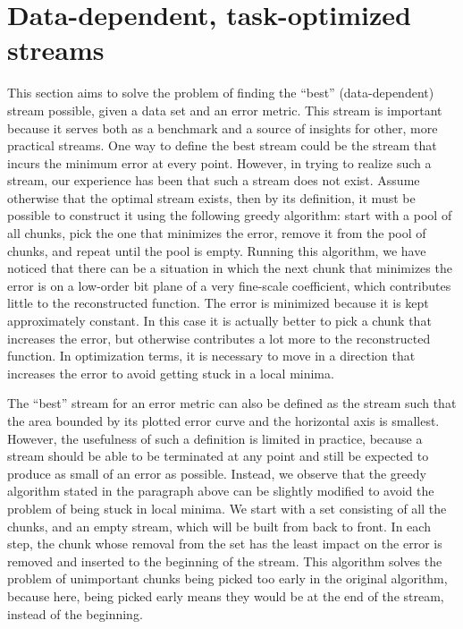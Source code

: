 \section{Data-dependent, task-optimized streams}
\label{sec:data_dep_streams}

This section aims to solve the problem of finding the ``best'' (data-dependent) stream possible,
given a data set and an error metric. This stream is important because it serves both as a benchmark
and a source of insights for other, more practical streams. One way to define the best stream could
be the stream that incurs the minimum error at every point. However, in trying to realize such a
stream, our experience has been that such a stream does not exist. Assume otherwise that the optimal
stream exists, then by its definition, it must be possible to construct it using the following
greedy algorithm: start with a pool of all chunks, pick the one that minimizes the error, remove it
from the pool of chunks, and repeat until the pool is empty. Running this algorithm, we have noticed
that there can be a situation in which the next chunk that minimizes the error is on a low-order bit
plane of a very fine-scale coefficient, which contributes little to the reconstructed function. The
error is minimized because it is kept approximately constant. In this case it is actually better to
pick a chunk that increases the error, but otherwise contributes a lot more to the reconstructed
function. In optimization terms, it is necessary to move in a direction that increases the error to
avoid getting stuck in a local minima.

The ``best'' stream for an error metric can also be defined as the stream such that the area bounded
by its plotted error curve and the horizontal axis is smallest. However, the usefulness of such a
definition is limited in practice, because a stream should be able to be terminated at any point and
still be expected to produce as small of an error as possible. Instead, we observe that the greedy
algorithm stated in the paragraph above can be slightly modified to avoid the problem of being stuck
in local minima. We start with a set consisting of all the chunks, and an empty stream, which will
be built from back to front. In each step, the chunk whose removal from the set has the least impact
on the error is removed and inserted to the beginning of the stream. This algorithm solves the
problem of unimportant chunks being picked too early in the original algorithm, because here, being
picked early means they would be at the end of the stream, instead of the beginning.

